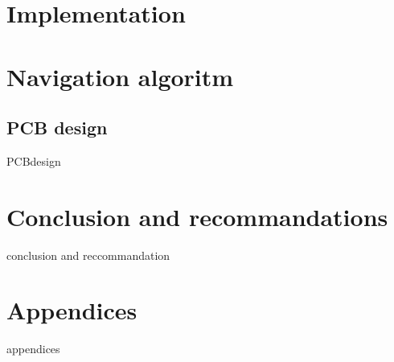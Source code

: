 \documentclass[parskip=full,11pt,a4paper,titlepage]{article}
\begin{document}
\section{Implementation}
\section{Navigation algoritm}

\subsection{PCB design}
{PCBdesign}
\clearpage

\section{Conclusion and recommandations}
{conclusion and reccommandation}
\clearpage

\section{Appendices}
{appendices}
\clearpage









\end{document}
